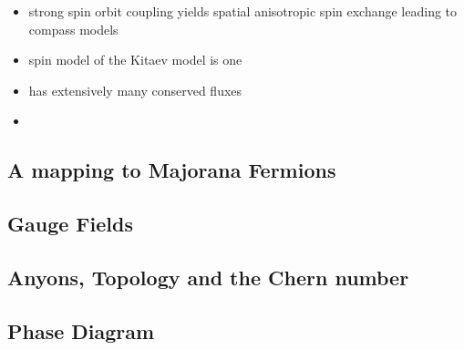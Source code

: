 \begin{itemize}
\tightlist
\item
  strong spin orbit coupling yields spatial anisotropic spin exchange leading to compass models~\autocite{kugelJahnTellerEffectMagnetism1982}
\item
  spin model of the Kitaev model is one
\item
  has extensively many conserved fluxes
\item
\end{itemize}

\hypertarget{a-mapping-to-majorana-fermions}{%
\subsection{A mapping to Majorana Fermions}\label{a-mapping-to-majorana-fermions}}

\hypertarget{gauge-fields}{%
\subsection{Gauge Fields}\label{gauge-fields}}

\hypertarget{anyons-topology-and-the-chern-number}{%
\subsection{Anyons, Topology and the Chern number}\label{anyons-topology-and-the-chern-number}}

\hypertarget{phase-diagram}{%
\subsection{Phase Diagram}\label{phase-diagram}}

\begin{Shaded}
\begin{Highlighting}[]

\end{Highlighting}
\end{Shaded}
